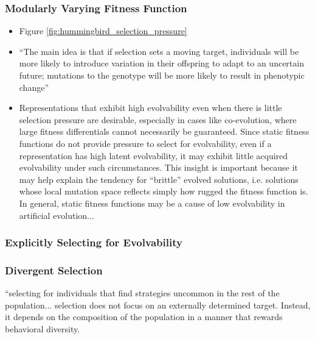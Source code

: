 \subsubsection{Modularly Varying Fitness Function} \label{sec:mvff}
  \begin{itemize}
    \item Figure \ref{fig:hummingbird_selection_pressure}
    \item ``The main idea is that if selection sets a moving target, individuals will be more likely to introduce variation in their offspring to adapt to an uncertain future; mutations to the genotype will be more likely to result in phenotypic change'' \cite{Wilder2015ReconcilingEvolvability}
    \item \begin{displayquote}
    Representations that exhibit high evolvability even when there is little selection pressure are desirable, especially in cases like co-evolution, where large fitness differentials cannot necessarily be guaranteed. Since  static  fitness  functions  do  not  provide  pressure  to select for evolvability, even if a representation has high latent evolvability, it may exhibit little acquired evolvability under  such  circumstances.   This  insight  is  important  because it may help explain the tendency for “brittle” evolved solutions, i.e. solutions whose local mutation space reflects simply how rugged the fitness function is.  In general, static fitness functions may be a cause of low evolvability in artificial evolution... \cite{Reisinger2006SelectingRepresentations}
      \end{displayquote}
  \end{itemize}
  
\subsubsection{Explicitly Selecting for Evolvability} \cite{Mengistu2016EvolvabilityIt}

\subsubsection{Divergent Selection} \label{sec:divergent_selection}
``selecting for individuals that find strategies uncommon in the rest of the population... selection does not focus on an externally determined target. Instead, it depends on the composition of the population in a manner that rewards behavioral diversity. \cite{Wilder2015ReconcilingEvolvability}
  


  

